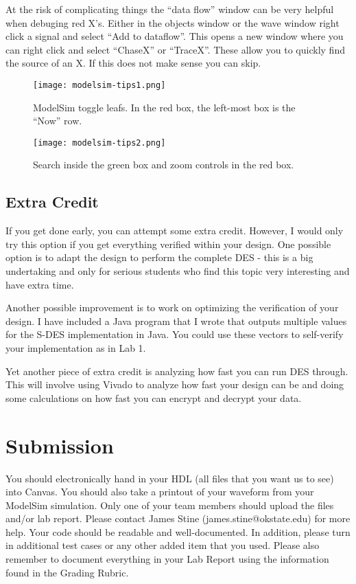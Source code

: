 \documentclass{article}
\begin{document}
At the risk of complicating things the ``data flow'' window can be very
helpful when debuging red X's.  Either in the objects window or the wave
window right click a signal and select ``Add to dataflow''. This opens
a new window where you can right click and select ``ChaseX'' or ``TraceX''.
These allow you to quickly find the source of an X.  If this does not make
sense you can skip.
\begin{figure} [t!]
  \centering
  \texttt{[image: modelsim-tips1.png]}
  \caption{ModelSim toggle leafs. In the red box, the left-most box is the ``Now'' row.}
  \label{modelsim-tips1.png}
\end{figure}
\begin{figure} [t!]
  \centering
  \texttt{[image: modelsim-tips2.png]}
  \caption{Search inside the green box and zoom controls in the red box.}
  \label{modelsim-tips2.png}
\end{figure}

\subsection{Extra Credit}

If you get done early, you can attempt some extra credit.  However, I
would only try this option if you get everything verified within your
design.  One possible option is to adapt the design to perform the
complete DES - this is a big undertaking and only for serious students
who find this topic very interesting and have extra time.

Another possible improvement is to work on optimizing the verification
of your design.  I have included a Java program that I wrote that
outputs multiple values for the S-DES implementation in Java.  You
could use these vectors to self-verify your implementation as in Lab 1.

Yet another piece of extra credit is analyzing how fast you can run
DES through.  This will involve using Vivado to analyze how fast your
design can be and doing some calculations on how fast you can encrypt
and decrypt your data.  

\section{Submission}

You should electronically hand in your HDL (all files that you want
us to see) into Canvas.
You should also take a printout of your waveform 
from your ModelSim simulation.  
Only one of your team members should upload
the files and/or lab report. Please contact
James Stine
(james.stine@okstate.edu) 
for more help.  Your
code should be
readable and well-documented. In addition, please turn in additional
test cases or any other added item that you used. 
Please also remember to document everything in your Lab Report using
the information found in the Grading Rubric.


    


\end{document}
